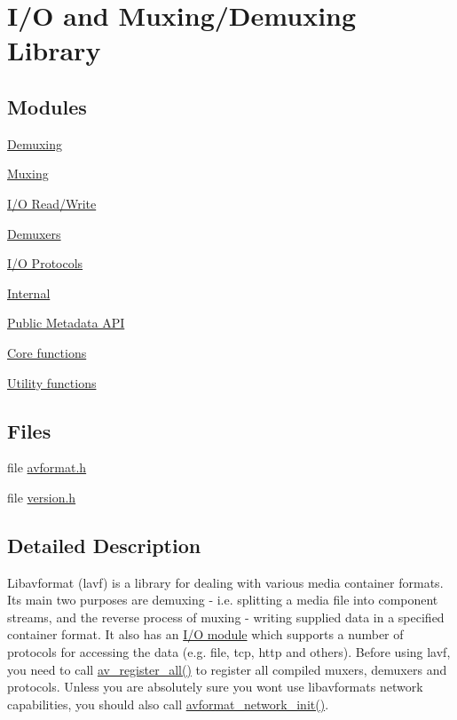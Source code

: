\hypertarget{group__libavf}{}\section{I/O and Muxing/\+Demuxing Library}
\label{group__libavf}
\subsection*{Modules}
\begin{DoxyCompactItemize}
\item 
\hyperlink{group__lavf__decoding}{Demuxing}
\item 
\hyperlink{group__lavf__encoding}{Muxing}
\item 
\hyperlink{group__lavf__io}{I/\+O Read/\+Write}
\item 
\hyperlink{group__lavf__codec}{Demuxers}
\item 
\hyperlink{group__lavf__protos}{I/\+O Protocols}
\item 
\hyperlink{group__lavf__internal}{Internal}
\item 
\hyperlink{group__metadata__api}{Public Metadata A\+PI}
\item 
\hyperlink{group__lavf__core}{Core functions}
\item 
\hyperlink{group__lavf__misc}{Utility functions}
\end{DoxyCompactItemize}
\subsection*{Files}
\begin{DoxyCompactItemize}
\item 
file \hyperlink{avformat_8h}{avformat.\+h}
\item 
file \hyperlink{ffmpeg_2libavformat_2version_8h}{version.\+h}
\end{DoxyCompactItemize}


\subsection{Detailed Description}
Libavformat (lavf) is a library for dealing with various media container formats. Its main two purposes are demuxing -\/ i.\+e. splitting a media file into component streams, and the reverse process of muxing -\/ writing supplied data in a specified container format. It also has an \hyperlink{group__lavf__io}{I/O module} which supports a number of protocols for accessing the data (e.\+g. file, tcp, http and others). Before using lavf, you need to call \hyperlink{group__lavf__core_ga917265caec45ef5a0646356ed1a507e3}{av\+\_\+register\+\_\+all()} to register all compiled muxers, demuxers and protocols. Unless you are absolutely sure you won\textquotesingle{}t use libavformat\textquotesingle{}s network capabilities, you should also call \hyperlink{group__lavf__core_ga84542023693d61e8564c5d457979c932}{avformat\+\_\+network\+\_\+init()}.

